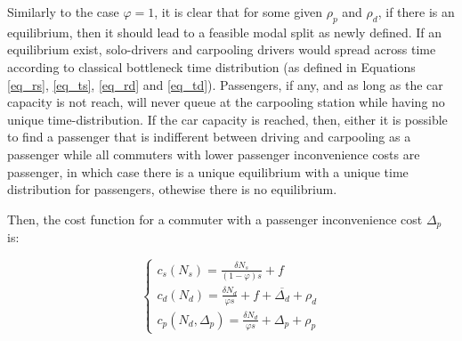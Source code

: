 \documentclass[english, a4paper]{article}
\theoremstyle{plain}
\theoremstyle{definition}
\theoremstyle{remark}
\begin{document}
Similarly to the case $\varphi = 1$, it is clear that for some given $\rho _p$ and $\rho _d$, if there is an equilibrium, then it should lead to a feasible modal split as newly defined. If an equilibrium exist, solo-drivers and carpooling drivers would spread across time according to classical bottleneck time distribution (as defined in Equations \ref{eq_rs}, \ref{eq_ts}, \ref{eq_rd} and \ref{eq_td}). Passengers, if any, and as long as the car capacity is not reach, will never queue at the carpooling station while having no unique time-distribution. If the car capacity is reached, then, either it is possible to find a passenger that is indifferent between driving and carpooling as a passenger while all commuters with lower passenger inconvenience costs are passenger, in which case there is a unique equilibrium with a unique time distribution for passengers, othewise there is no equilibrium.

Then, the cost function for a commuter with a passenger inconvenience cost $\Delta _p$ is:

\begin{equation}
    \left\{
    \begin{array}{l}
        c_s(N_s) = \frac{\delta N_s}{(1-\varphi )s} + f\\
        c_d(N_d) = \frac{\delta N_d}{\varphi s} + f + \overline{\Delta _d} + \rho _d\\
        c_p(N_d, \Delta _p) = \frac{\delta N_d}{\varphi s} + \Delta _p + \rho _p
    \end{array} 
    \right.
\end{equation}
\end{document}
